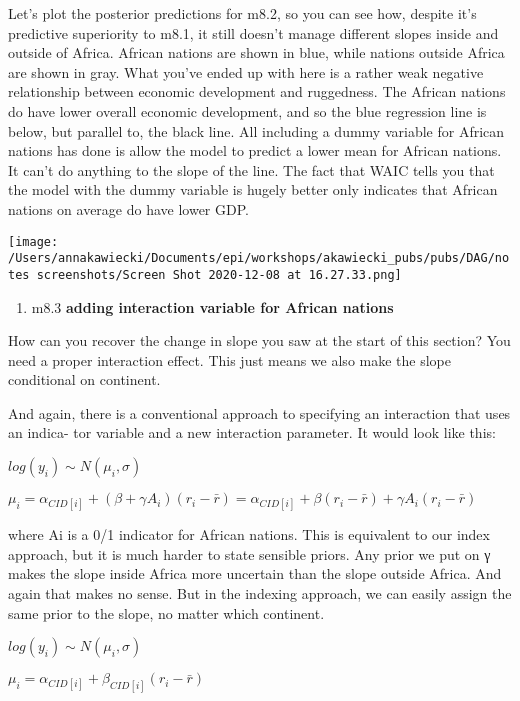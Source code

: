 \documentclass[
]{article}
\providecommand{\tightlist}{%
  \setlength{\itemsep}{0pt}\setlength{\parskip}{0pt}}
\begin{document}
Let's plot the posterior predictions for m8.2, so you can see how,
despite it's predictive superiority to m8.1, it still doesn't manage
different slopes inside and outside of Africa. African nations are shown
in blue, while nations outside Africa are shown in gray. What you've
ended up with here is a rather weak negative relationship between
economic development and ruggedness. The African nations do have lower
overall economic development, and so the blue regression line is below,
but parallel to, the black line. All including a dummy variable for
African nations has done is allow the model to predict a lower mean for
African nations. It can't do anything to the slope of the line. The fact
that WAIC tells you that the model with the dummy variable is hugely
better only indicates that African nations on average do have lower GDP.

\texttt{[image: /Users/annakawiecki/Documents/epi/workshops/akawiecki\_pubs/pubs/DAG/notes screenshots/Screen Shot 2020-12-08 at 16.27.33.png]}

\begin{enumerate}
\def\labelenumi{\arabic{enumi}.}
\setcounter{enumi}{2}
\tightlist
\item
  m8.3 \textbf{adding interaction variable for African nations}
\end{enumerate}

How can you recover the change in slope you saw at the start of this
section? You need a proper interaction effect. This just means we also
make the slope conditional on continent.

And again, there is a conventional approach to specifying an interaction
that uses an indica- tor variable and a new interaction parameter. It
would look like this:

\(log(y_i) \sim N(\mu_i, \sigma)\)

\(\mu_i = \alpha_{CID[i]} + (\beta + \gamma A_i) (r_i - \bar{r})= \alpha_{CID[i]} +\beta(r_i - \bar{r})+ \gamma A_i(r_i - \bar{r})\)

where Ai is a 0/1 indicator for African nations. This is equivalent to
our index approach, but it is much harder to state sensible priors. Any
prior we put on γ makes the slope inside Africa more uncertain than the
slope outside Africa. And again that makes no sense. But in the indexing
approach, we can easily assign the same prior to the slope, no matter
which continent.

\(log(y_i) \sim N(\mu_i, \sigma)\)

\(\mu_i = \alpha_{CID[i]} + \beta_{CID[i]}(r_i - \bar{r})\)
\end{document}
